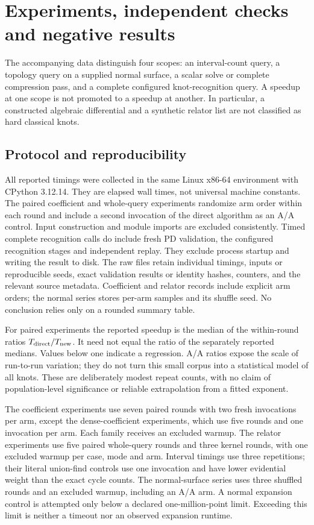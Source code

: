 \section{Experiments, independent checks and negative results}
\label{sec:experiments}

The accompanying data distinguish four scopes: an interval-count query,
a topology query on a supplied normal surface, a scalar solve or complete
compression pass, and a complete configured knot-recognition query. A
speedup at one scope is not promoted to a speedup at another. In particular,
a constructed algebraic differential and a synthetic relator list are not
classified as hard classical knots.

\subsection{Protocol and reproducibility}

All reported timings were collected in the same Linux x86-64 environment
with CPython 3.12.14. They are elapsed wall times, not universal machine
constants. The paired coefficient and whole-query experiments randomize
arm order within each round and include a second invocation of the direct
algorithm as an A/A control. Input construction and module imports are
excluded consistently. Timed complete recognition calls do include fresh
PD validation, the configured recognition stages and independent replay.
They exclude process startup and writing the result to disk. The raw files retain individual timings, inputs or reproducible seeds,
exact validation results or identity hashes, counters, and the relevant
source metadata. Coefficient and relator records include explicit arm
orders; the normal series stores per-arm samples and its shuffle seed.
No conclusion relies only on a rounded summary table.

For paired experiments the reported speedup is the median of the
within-round ratios $T_{\rm direct}/T_{\rm new}$. It need not equal the
ratio of the separately reported medians. Values below one indicate a
regression. A/A ratios expose the scale of run-to-run variation; they do
not turn this small corpus into a statistical model of all knots. These
are deliberately modest repeat counts, with no claim of population-level
significance or reliable extrapolation from a fitted exponent.

The coefficient experiments use seven paired rounds with two fresh
invocations per arm, except the dense-coefficient experiments, which use
five rounds and one invocation per arm. Each family receives an excluded
warmup. The relator experiments use five paired whole-query rounds and
three kernel rounds, with one excluded warmup per case, mode and arm.
Interval timings use three repetitions; their literal union-find controls
use one invocation and have lower evidential weight than the exact cycle
counts. The normal-surface series uses three shuffled rounds and an
excluded warmup, including an A/A arm. A normal expansion control is
attempted only below a declared one-million-point limit. Exceeding this
limit is neither a timeout nor an observed expansion runtime.

